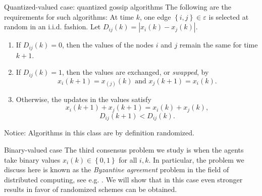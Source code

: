 \documentclass[xcolor={dvipsnames}]{beamer}
\begin{document}
	\begin{frame}{Quantized-valued case: quantized gossip algorithms}
		The following are the requirements for such algorithms: At time $k$, one edge 
		$\left\{ i, j \right\} \in \varepsilon$ 
		is selected at random in an i.i.d. fashion. Let 
		$D_{ij}(k)=\left| x_{i}(k)-x_{j}(k) \right|$.
		
		\begin{enumerate}[label=(\alph*)]
			\item If $D_{ij}(k)=0$, then the values of the nodes $i$ and $j$ remain the same for time $k+1$.
			\item If $D_{ij}(k)=1$, then the values are exchanged, or
			\textit{swapped}, by
			\begin{equation}
				x_{i}(k+1)=x_(j)(k) \text{ and } x_{j}(k+1)=x_{i}(k).
			\end{equation}
			\item Otherwise, the updates in the values satisfy
			\begin{equation*}
				x_{i}(k+1)+x_{j}(k+1)=x_{i}(k)+x_{j}(k),
			\end{equation*}
			\begin{equation*}
				D_{ij}(k+1)< D_{ij}(k).
			\end{equation*}
		\end{enumerate}
		
		\begin{block}{Notice:}
			Algorithms in this class are by definition randomized.
		\end{block}
	\end{frame}
	
	\begin{frame}{Binary-valued case}
		The third consensus problem we study is when the agents
		take binary values $x_{i}(k) \in \left\{ 0,1 \right\}$ for all $i, k$. In particular,
		the problem we discuss here is known as the \textit{Byzantine
			agreement} problem in the field of distributed computing,
		see e.g. \cite{bib17}. We will show that in this case even stronger
		results in favor of randomized schemes can be obtained.
	\end{frame}
	
\end{document}
